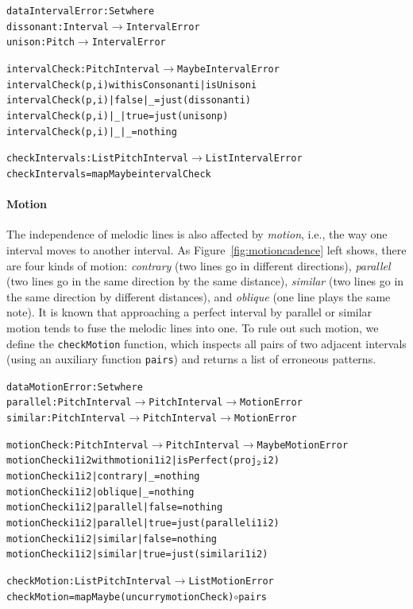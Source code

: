 \begin{alltt}
data IntervalError : Set where
  dissonant : Interval \(\rightarrow\) IntervalError
  unison    : Pitch    \(\rightarrow\) IntervalError

intervalCheck : PitchInterval \(\rightarrow\) Maybe IntervalError
intervalCheck (p , i) with isConsonant i | isUnison i
intervalCheck (p , i) | false | _    = just (dissonant i)
intervalCheck (p , i) | _     | true = just (unison p)
intervalCheck (p , i) | _     | _    = nothing

checkIntervals : List PitchInterval \(\rightarrow\) List IntervalError
checkIntervals = mapMaybe intervalCheck
\end{alltt}

\paragraph{Motion}

\MotionCadence

The independence of melodic lines is also affected by \emph{motion},
i.e., the way one interval moves to another interval.
As Figure~\ref{fig:motioncadence} left shows, there are four kinds of motion:
\emph{contrary} (two lines go in different directions),
\emph{parallel} (two lines go in the same direction by the same
distance), \emph{similar} (two lines go in the same direction by
different distances), and \emph{oblique} (one line plays the same note).
It is known that approaching a perfect interval by parallel or similar
motion tends to fuse the melodic lines into one.
To rule out such motion, we define the \texttt{checkMotion}
function, which inspects all pairs of two adjacent intervals (using an
auxiliary function \texttt{pairs}) and returns a list of erroneous patterns.

\begin{alltt}
data MotionError : Set where
  parallel : PitchInterval \(\rightarrow\) PitchInterval \(\rightarrow\) MotionError
  similar  : PitchInterval \(\rightarrow\) PitchInterval \(\rightarrow\) MotionError

motionCheck : PitchInterval \(\rightarrow\) PitchInterval \(\rightarrow\) Maybe MotionError
motionCheck i1 i2 with motion i1 i2 | isPerfect (proj\(\sb{\mathtt{2}}\) i2)
motionCheck i1 i2 | contrary | \_     = nothing
motionCheck i1 i2 | oblique  | \_     = nothing
motionCheck i1 i2 | parallel | false = nothing
motionCheck i1 i2 | parallel | true  = just (parallel i1 i2)
motionCheck i1 i2 | similar  | false = nothing
motionCheck i1 i2 | similar  | true  = just (similar i1 i2)

checkMotion : List PitchInterval \(\rightarrow\) List MotionError
checkMotion = mapMaybe (uncurry motionCheck) \(\circ\) pairs
\end{alltt}

